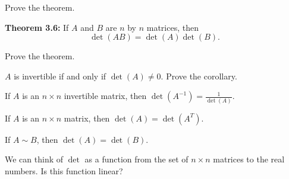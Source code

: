 \documentclass[12pt,letterpaper]{article}
\begin{document}
\begin{enumerate}
\newpage

\Problem Prove the theorem.

\newpage

{\bf Theorem 3.6:} If $A$ and $B$ are $n$ by $n$ matrices, then $$\operatorname{det}(AB)=\operatorname{det}(A)\operatorname{det}(B).$$

\Problem Prove the theorem.

\vfill
\vfill

 $A$ is invertible if and only if $\operatorname{det}(A)\neq0$. Prove the corollary.

\vfill

\newpage


\Part If $A$ is an $n\times n$ invertible matrix, then $\operatorname{det}(A^{-1})=\frac{1}{\operatorname{det}(A)}$.

\vfill

\Part If $A$ is an $n\times n$ matrix, then $\operatorname{det}(A)=\operatorname{det}(A^{T})$.

\vfill

\Part If $A \sim B$, then $\operatorname{det}(A)=\operatorname{det}(B)$.

\vfill

\Problem We can think of $\operatorname{det}$ as a function from the set of $n\times n$ matrices to the real numbers. Is this function linear?

\vfill




\end{enumerate}
\end{document}
